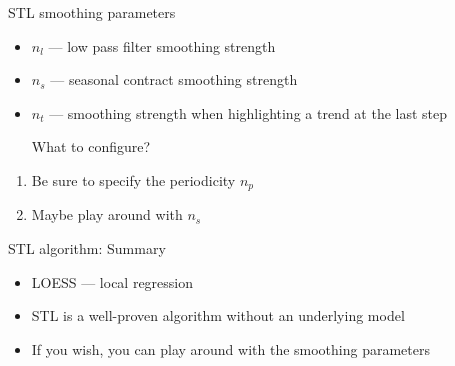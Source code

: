 \begin{frame}{STL smoothing parameters}
	
	\begin{itemize}[<+->]
		\item $n_l$ — low pass filter smoothing strength
		
		\item $n_s$ — seasonal contract smoothing strength
		\item $n_t$ — smoothing strength when highlighting a trend at the last step
		
		
		
		\alert{What to configure?}
		
		
	\end{itemize}
	
	\begin{enumerate}[<+->]
		\item Be sure to specify the periodicity $n_p$
		\item Maybe play around with $n_s$
	\end{enumerate}
	
\end{frame}

\begin{frame}{STL algorithm: Summary}
	\begin{itemize}[<+->]
		\item LOESS — local regression
		\item STL is a well-proven algorithm without an underlying model
		\item If you wish, you can play around with the smoothing parameters
	\end{itemize}
	
\end{frame}


